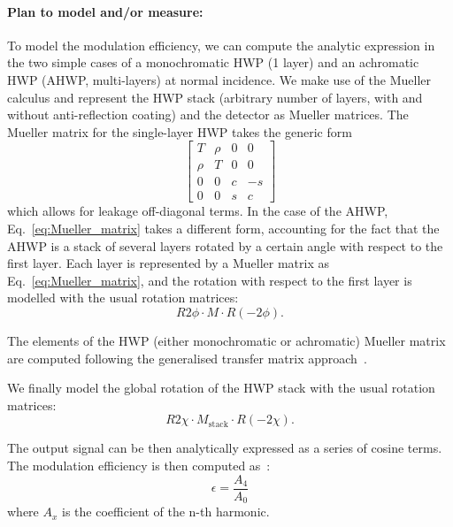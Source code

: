 \paragraph{Plan to model and/or measure:}
To model the modulation efficiency, we can compute the analytic expression in the two simple cases of a monochromatic HWP (1 layer) and an achromatic HWP (AHWP, multi-layers) at normal incidence. We make use of the Mueller calculus and represent the HWP stack (arbitrary number of layers, with and without anti-reflection coating) and the detector as Mueller matrices. The Mueller matrix for the single-layer HWP takes the generic form 
\begin{equation} \label{eq:Mueller_Matrix}
\begin{bmatrix}
   T  &\rho  &0  &0\\
   \rho  &T  &0  &0\\
   0  &0  &c  &-s\\
   0  &0  &s  &c
\end{bmatrix}
\end{equation}
which allows for leakage off-diagonal terms. In the case of the AHWP, Eq.~\ref{eq:Mueller_matrix} takes a different form, accounting for the fact that the AHWP is a stack of several layers rotated by a certain angle with respect to the first layer. Each layer is represented by a Mueller matrix as Eq.~\ref{eq:Mueller_matrix}, and the rotation with respect to the first layer is modelled with the usual rotation matrices:
\begin{equation}
R{2\phi}\cdot M \cdot R(-2\phi).
\end{equation} 

The elements of the HWP (either monochromatic or achromatic) Mueller matrix are computed following the generalised transfer matrix approach~\cite{Essinger-Hileman_TM}. 

We finally model the global rotation of the HWP stack with the usual rotation matrices:
\begin{equation}
R{2\chi}\cdot M_\mathrm{stack} \cdot R(-2\chi).
\end{equation}

The output signal can be then analytically expressed as a series of cosine terms. The modulation efficiency is then computed as~\cite{Hanany:2005vx,Matsumura:2008zx}:
\begin{equation}\label{eq:eff}
\epsilon=\frac{A_4}{A_0}
\end{equation}
where $A_x$ is the coefficient of the n-th harmonic.

